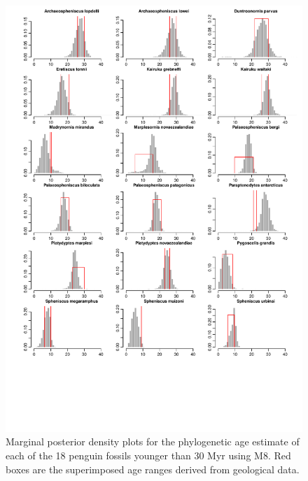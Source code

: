 \documentclass[11pt]{article}
\newcommand{\Mrelaxed}{{M8}}
\begin{document}
\begin{figure}
\includegraphics[width=6in]{run8_5/8_fossilDatingHist_younger.pdf}
\caption{\label{hist8_younger}Marginal posterior density plots for the phylogenetic age estimate of each of the 18 penguin fossils younger than 30 Myr using \Mrelaxed{}. Red boxes are the superimposed age ranges derived from geological data.}
\end{figure}
\end{document}
